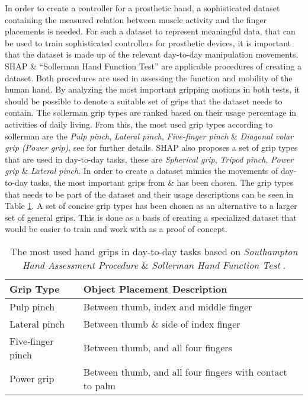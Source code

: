 \documentclass[../main.tex]{subfiles}
\begin{document}
In order to create a controller for a prosthetic hand, a sophisticated dataset containing the measured relation between muscle activity and the finger placements is needed.
For such a dataset to represent meaningful data, that can be used to train sophisticated controllers for prosthetic devices, it is important that the dataset is made up of the relevant day-to-day manipulation movements.
\gls{SHAP} \cite{shap} \& ``Sollerman Hand  Function Test''  \cite{sollerman} are applicable procedures of creating a dataset.
Both procedures are used in assessing the function and mobility of the human hand.
By analyzing the most important gripping motions in both tests, it should be possible to denote a suitable set of grips that the dataset needs to contain.
The sollerman grip types are ranked based on their usage percentage in activities of daily living.
From this, the most used grip types according to sollerman are the \textit{Pulp pinch}, \textit{Lateral pinch}, \textit{Five-finger pinch} \& \textit{Diagonal volar grip (Power grip)}, see \cite{sollerman} for further details.
SHAP also proposes a set of grip types that are used in day-to-day tasks, these are \textit{Spherical grip}, \textit{Tripod pinch}, \textit{Power grip} \& \textit{Lateral pinch}.
In order to create a dataset mimics the movements of day-to-day tasks, the most important grips from \cite{sollerman} \& \cite{shap} has been chosen.
The grip types that needs to be part of the dataset and their usage descriptions can be seen in Table \ref{tab:grips}.
A set of concise grip types has been chosen as an alternative to a larger set of general grips.
This is done as a basis of creating a specialized dataset that would be easier to train and work with as a proof of concept.

\begin{table}[H]
\begin{center}
\begin{tabular}{ |l|l| } 
 \hline
 Grip Type & Object Placement Description \\ 
 \hline
 Pulp pinch & Between thumb, index and middle finger \\ 
 Lateral pinch & Between thumb \& side of index finger \\ 
 Five-finger pinch & Between thumb, and all four fingers \\ 
 Power grip & Between thumb, and all four fingers with contact to palm \\ 
 \hline
\end{tabular}
\caption{The most used hand grips in day-to-day tasks based on \textit{Southampton Hand Assessment Procedure} \cite{shap} \& \textit{Sollerman Hand Function Test} \cite{sollerman}.}
\label{tab:grips}
\end{center}
\end{table}
\end{document}
